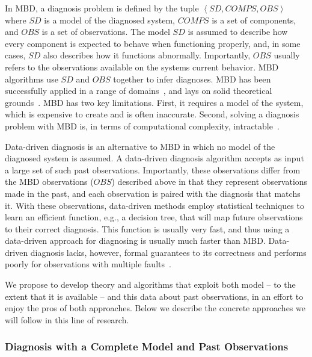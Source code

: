 \documentclass[12pt]{article}
\newcommand{\tuple}[1]{\ensuremath{\left \langle #1 \right \rangle }}
\begin{document}
In MBD, a diagnosis problem is defined by the tuple $\tuple{SD, COMPS, OBS}$ 
where $SD$ is a model of the diagnosed system, 
$COMPS$ is a set of components, 
and $OBS$ is a set of observations. 
The model $SD$ is assumed to describe how every component is expected to behave when functioning properly, and, in some cases, $SD$ also describes how it functions abnormally. 
Importantly, $OBS$ usually refers to the observations available on the systems current behavior. MBD algorithms use $SD$ and $OBS$ together to infer diagnoses. 
MBD has been successfully applied in a range of domains~\cite{williams96,struss2003model,wotawa2002model}, and lays on solid theoretical grounds~\cite{de1987diagnosing,reiter1987theory}. MBD has two key limitations. First, it requires a model of the system, which is expensive to create and is often inaccurate. Second, solving a diagnosis problem with MBD is, in terms of computational complexity, intractable~\cite{bylander1991computational}. 

Data-driven diagnosis is an alternative to MBD in which no model of the diagnosed system is assumed. A data-driven diagnosis algorithm accepts as input a large set of such past observations. 
Importantly, these observations differ from the MBD observations ($OBS$) described above 
in that they represent observations made in the past, and each observation is paired with the diagnosis that matchs it. With these observations, data-driven methods employ statistical techniques to learn an efficient function, e.g., a decision tree, that will map future observations to their correct diagnosis. This function is usually very fast, and thus using a data-driven approach for diagnosing is usually much faster than MBD. 
Data-driven diagnosis lacks, however, formal guarantees to its correctness and performs poorly for observations with multiple faults~\cite{keren2011model}. 



We propose to develop theory and algorithms that exploit both model -- to the extent that it is available -- and this data about past observations, in an effort to enjoy the pros of both approaches. Below we describe the concrete approaches we will follow in this line of research.

\subsubsection{Diagnosis with a Complete Model and Past Observations}
\end{document}
